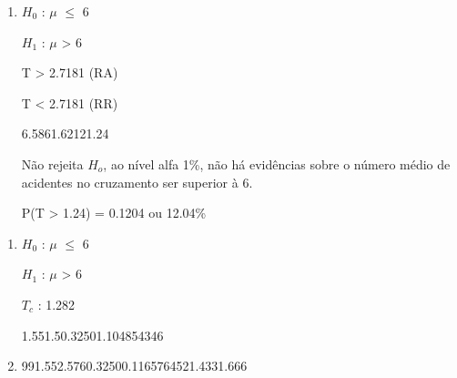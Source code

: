 
\begin{question}
    
    \begin{enumerate}[label={\textbf{\alph*)}}]
        
        \item 
    
            $H_0$ : $\mu$ $\leq$ 6 

            $H_1$ : $\mu$ > 6 
        
            T > 2.7181 (RA)

            T < 2.7181 (RR)

            \begin{formula7}
                {6.58}{6}{1.62}{12}{1.24}
            \end{formula7}

            Não rejeita $H_o$, ao nível alfa 1\%, não há evidências sobre o número médio de 
            acidentes no cruzamento ser superior à 6.

            P(T > 1.24) = 0.1204 ou 12.04\%

    \end{enumerate}
\end{question}


\begin{question}
    
    \begin{enumerate}[label={\textbf{\alph*)}}]
        
        \item 
    
            $H_0$ : $\mu$ $\leq$ 6 

            $H_1$ : $\mu$ > 6 
        
            $T_c$ : 1.282

            \begin{formula7}
                {1.55}{1.5}{0.32}{50}{1.104854346}
            \end{formula7}

        \item 
    
            \begin{formula1}
                {99}{1.55}{2.576}{0.32}{50}{0.116576452}{1.433}{1.666}
            \end{formula1}

    \end{enumerate}
\end{question}

